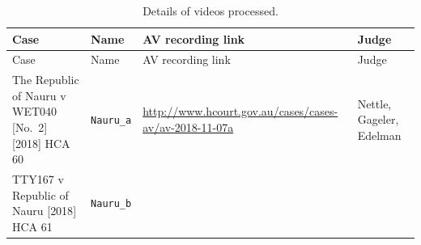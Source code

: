 \documentclass{monashthesis}
\begin{document}
\begin{longtable}[]{@{}llll@{}}
\caption{Details of videos processed.}\tabularnewline
\toprule
\begin{minipage}[b]{0.22\columnwidth}\raggedright
Case\strut
\end{minipage} & \begin{minipage}[b]{0.15\columnwidth}\raggedright
Name\strut
\end{minipage} & \begin{minipage}[b]{0.30\columnwidth}\raggedright
AV recording link\strut
\end{minipage} & \begin{minipage}[b]{0.22\columnwidth}\raggedright
Judge\strut
\end{minipage}\tabularnewline
\midrule
\endfirsthead
\toprule
\begin{minipage}[b]{0.22\columnwidth}\raggedright
Case\strut
\end{minipage} & \begin{minipage}[b]{0.15\columnwidth}\raggedright
Name\strut
\end{minipage} & \begin{minipage}[b]{0.30\columnwidth}\raggedright
AV recording link\strut
\end{minipage} & \begin{minipage}[b]{0.22\columnwidth}\raggedright
Judge\strut
\end{minipage}\tabularnewline
\midrule
\endhead
\begin{minipage}[t]{0.22\columnwidth}\raggedright
The Republic of Nauru v WET040 {[}No.~2{]} {[}2018{]} HCA 60\strut
\end{minipage} & \begin{minipage}[t]{0.15\columnwidth}\raggedright
\texttt{Nauru\_a}\strut
\end{minipage} & \begin{minipage}[t]{0.30\columnwidth}\raggedright
\url{http://www.hcourt.gov.au/cases/cases-av/av-2018-11-07a}\strut
\end{minipage} & \begin{minipage}[t]{0.22\columnwidth}\raggedright
Nettle, Gageler, Edelman\strut
\end{minipage}\tabularnewline
\begin{minipage}[t]{0.22\columnwidth}\raggedright
TTY167 v Republic of Nauru {[}2018{]} HCA 61\strut
\end{minipage} & \begin{minipage}[t]{0.15\columnwidth}\raggedright
\texttt{Nauru\_b}\strut

\end{minipage}
\end{longtable}
\end{document}
